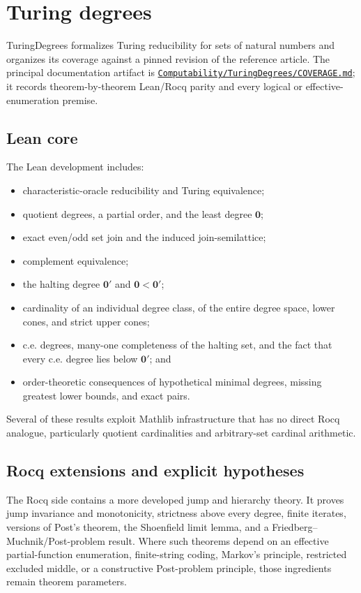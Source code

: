 \documentclass[
  10pt,
  a4paper,
  twoside,
  open=any,
  parskip=half,
  headings=big
]{scrreprt}
\newcommand{\CommitFull}{56a402bf82a9aab119fcbe3e96b991d387b221c5}
\newcommand{\RepoWeb}{https://github.com/VladimirReshetnikov/ProveIt}
\newcommand{\RepoBlobBase}{\RepoWeb/blob/\CommitFull}
\newcommand{\project}[1]{\textsf{#1}}
\newcommand{\RepoFile}[1]{\href{\RepoBlobBase/#1}{\nolinkurl{#1}}}
\begin{document}
\section{Turing degrees}
\label{sec:turing-degrees}

\project{TuringDegrees} formalizes Turing reducibility for sets of natural numbers and organizes its coverage against a pinned revision of the reference article. The principal documentation artifact is
\RepoFile{Computability/TuringDegrees/COVERAGE.md}; it records theorem-by-theorem Lean/Rocq parity and every logical or effective-enumeration premise.

\subsection{Lean core}

The Lean development includes:

\begin{itemize}
  \item characteristic-oracle reducibility and Turing equivalence;
  \item quotient degrees, a partial order, and the least degree $\mathbf 0$;
  \item exact even/odd set join and the induced join-semilattice;
  \item complement equivalence;
  \item the halting degree $\mathbf 0'$ and $\mathbf 0<\mathbf 0'$;
  \item cardinality of an individual degree class, of the entire degree space, lower cones, and strict upper cones;
  \item c.e. degrees, many-one completeness of the halting set, and the fact that every c.e. degree lies below $\mathbf 0'$; and
  \item order-theoretic consequences of hypothetical minimal degrees, missing greatest lower bounds, and exact pairs.
\end{itemize}

Several of these results exploit Mathlib infrastructure that has no direct Rocq analogue, particularly quotient cardinalities and arbitrary-set cardinal arithmetic.

\subsection{Rocq extensions and explicit hypotheses}

The Rocq side contains a more developed jump and hierarchy theory. It proves jump invariance and monotonicity, strictness above every degree, finite iterates, versions of Post's theorem, the Shoenfield limit lemma, and a Friedberg--Muchnik/Post-problem result. Where such theorems depend on an effective partial-function enumeration, finite-string coding, Markov's principle, restricted excluded middle, or a constructive Post-problem principle, those ingredients remain theorem parameters.
\end{document}
